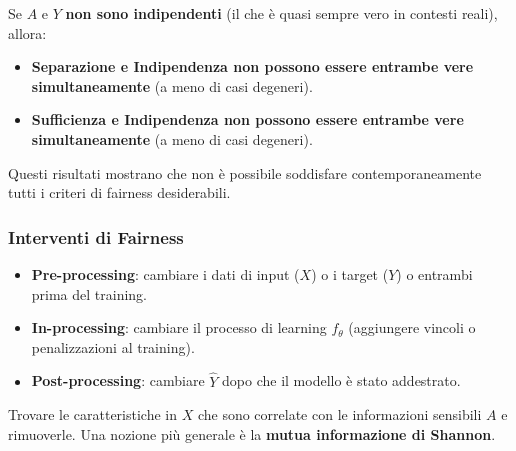 \documentclass[a4paper,11pt]{article}
\begin{document}
\begin{teorema}
Se $A$ e $Y$ \textbf{non sono indipendenti} (il che \`{e} quasi sempre vero in contesti reali), allora:
\begin{itemize}
  \item \textbf{Separazione e Indipendenza non possono essere entrambe vere simultaneamente} (a meno di casi degeneri).
  \item \textbf{Sufficienza e Indipendenza non possono essere entrambe vere simultaneamente} (a meno di casi degeneri).
\end{itemize}
Questi risultati mostrano che non \`{e} possibile soddisfare contemporaneamente tutti i criteri di fairness desiderabili.
\end{teorema}

\subsubsection{Interventi di Fairness}

\begin{itemize}
  \item \textbf{Pre-processing}: cambiare i dati di input ($X$) o i target ($Y$) o entrambi prima del training.
  \item \textbf{In-processing}: cambiare il processo di learning $f_\theta$ (aggiungere vincoli o penalizzazioni al training).
  \item \textbf{Post-processing}: cambiare $\hat{Y}$ dopo che il modello \`{e} stato addestrato.
\end{itemize}

\begin{definizione}
Trovare le caratteristiche in $X$ che sono correlate con le informazioni sensibili $A$ e rimuoverle. Una nozione pi\`{u} generale \`{e} la \textbf{mutua informazione di Shannon}.
\end{definizione}
\end{document}
